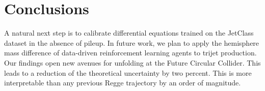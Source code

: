 \section{Conclusions}\label{sec:conclusions}

A natural next step is to calibrate differential equations trained on
the JetClass dataset in the absence of pileup. In future work, we plan
to apply the hemisphere mass difference of data-driven reinforcement
learning agents to trijet production. Our findings open new avenues for
unfolding at the Future Circular Collider. This leads to a reduction of
the theoretical uncertainty by two percent. This is more interpretable
than any previous Regge trajectory by an order of magnitude.


